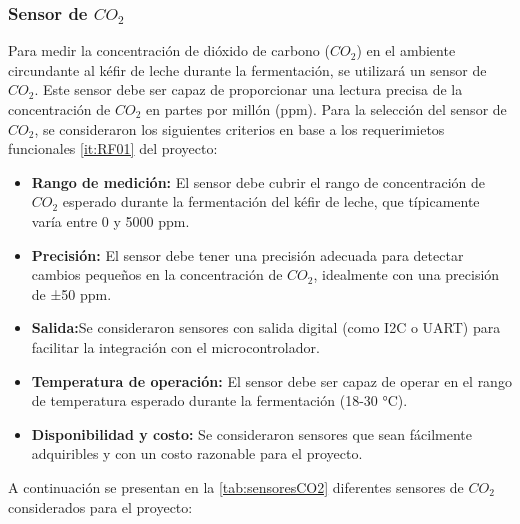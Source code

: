 \subsubsection{Sensor de $CO_{2}$}
Para medir la concentración de dióxido de carbono ($CO_{2}$) en el ambiente
circundante al kéfir de leche durante la fermentación, se utilizará un
sensor de $CO_{2}$. Este sensor debe ser capaz de proporcionar una lectura precisa
de la concentración de $CO_{2}$ en partes por millón (ppm).
Para la selección del sensor de $CO_{2}$, se consideraron los siguientes
criterios en base a los requerimietos funcionales \ref{it:RF01} del
proyecto:
\begin{itemize}
    \item \textbf{Rango de medición:} El sensor debe cubrir el rango de concentración
    de $CO_{2}$ esperado durante la fermentación del kéfir de leche, que típicamente varía
    entre 0 y 5000 ppm.
    \item \textbf{Precisión:} El sensor debe tener una precisión adecuada para detectar
    cambios pequeños en la concentración de $CO_{2}$, idealmente con una precisión de ±50 ppm.
    \item \textbf{Salida:}Se consideraron sensores con salida digital (como I2C o
    UART) para facilitar la integración con el microcontrolador.
    \item \textbf{Temperatura de operación:} El sensor debe ser capaz de operar en el
    rango de temperatura esperado durante la fermentación (18-30 °C).
    \item \textbf{Disponibilidad y costo:} Se consideraron sensores que sean fácilmente
    adquiribles y con un costo razonable para el proyecto.
\end{itemize}
A continuación se presentan en la \cref{tab:sensoresCO2} diferentes sensores de $CO_{2}$
considerados para el proyecto:


